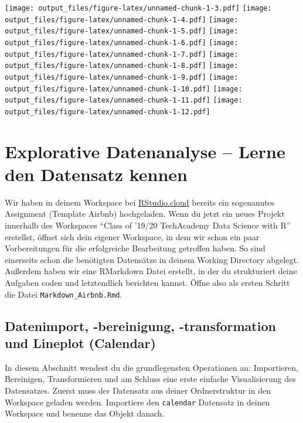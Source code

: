 \documentclass[
]{book}
\begin{document}
\texttt{[image: output\_files/figure-latex/unnamed-chunk-1-3.pdf]} \texttt{[image: output\_files/figure-latex/unnamed-chunk-1-4.pdf]} \texttt{[image: output\_files/figure-latex/unnamed-chunk-1-5.pdf]} \texttt{[image: output\_files/figure-latex/unnamed-chunk-1-6.pdf]} \texttt{[image: output\_files/figure-latex/unnamed-chunk-1-7.pdf]} \texttt{[image: output\_files/figure-latex/unnamed-chunk-1-8.pdf]} \texttt{[image: output\_files/figure-latex/unnamed-chunk-1-9.pdf]} \texttt{[image: output\_files/figure-latex/unnamed-chunk-1-10.pdf]} \texttt{[image: output\_files/figure-latex/unnamed-chunk-1-11.pdf]} \texttt{[image: output\_files/figure-latex/unnamed-chunk-1-12.pdf]}

\hypertarget{explorative-datenanalyse-lerne-den-datensatz-kennen-1}{%
\chapter{Explorative Datenanalyse -- Lerne den Datensatz kennen}\label{explorative-datenanalyse-lerne-den-datensatz-kennen-1}}

Wir haben in deinem Workspace bei \href{rstudio.cloud}{RStudio.cloud} bereits ein sogenanntes Assignment (Template Airbnb) hochgeladen.
Wenn du jetzt ein neues Projekt innerhalb des Workspaces ``Class of '19/20 \textbar{} TechAcademy \textbar{} Data Science with R'' erstellst, öffnet sich dein eigener Workspace, in dem wir schon ein paar Vorbereitungen für die erfolgreiche Bearbeitung getroffen haben.
So sind einerseits schon die benötigten Datensätze in deinem Working Directory abgelegt. Außerdem haben wir eine RMarkdown Datei erstellt, in der du strukturiert deine Aufgaben coden und letztendlich berichten kannst. Öffne also als ersten Schritt die Datei \texttt{Markdown\_Airbnb.Rmd}.

\hypertarget{datenimport--bereinigung--transformation-und-lineplot-calendar}{%
\section{Datenimport, -bereinigung, -transformation und Lineplot (Calendar)}\label{datenimport--bereinigung--transformation-und-lineplot-calendar}}

In diesem Abschnitt wendest du die grundlegensten Operationen an: Importieren, Bereinigen, Transformieren und am Schluss eine erste einfache Visualisierung des Datensatzes.
Zuerst muss der Datensatz aus deiner Ordnerstruktur in den Workspace geladen werden.
Importiere den \texttt{calendar} Datensatz in deinen Workspace und benenne das Objekt danach.
\end{document}
